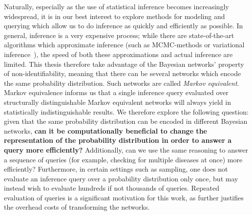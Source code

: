 \null \quad \quad Naturally, especially as the use of statistical inference becomes increasingly widespread, it is in our best interest to explore methods for modeling and querying which allow us to do inference as quickly and efficiently as possible. In general, inference is a very expensive process; while there are state-of-the-art algorithms which approximate inference (such as MCMC-methods or variational inference~\cite{NUTS, varinf}), the speed of both these approximations and actual inference are limited. This thesis therefore take advantage of the Bayesian networks' property of non-identifiability, meaning that there can be several networks which encode the same probability distribution. Such networks are called \textit{Markov equivalent}. Markov equivalence informs us that a single inference query evaluated over structurally distinguishable Markov equivalent networks will always yield in statistically indistinguishable results. \newline 
\null \quad \quad We therefore explore the following question: given that the same probability distribution can be encoded in different Bayesian networks, \textbf{can it be computationally beneficial to change the representation of the probability distribution in order to answer a query more efficiently?} Additionally, can we use the same reasoning to answer a sequence of queries (for example, checking for multiple diseases at once) more efficiently?  \newline
\null \quad \quad Furthermore, in certain settings such as sampling, one does not evaluate an inference query over a probability distribution only once, but may instead wish to evaluate hundreds if not thousands of queries. Repeated evaluation of queries is a significant motivation for this work, as further justifies the overhead costs of transforming the networks.  \newline


